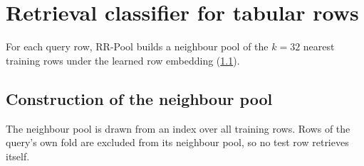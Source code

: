 \section{Retrieval classifier for tabular rows}\label{sec:method}
For each query row, RR-Pool builds a neighbour pool of the $k = 32$ nearest training rows under the learned row embedding (\cref{sec:neighbour-pool}).

\subsection{Construction of the neighbour pool}\label{sec:neighbour-pool}
The neighbour pool is drawn from an index over all training rows. Rows of the query's own fold are excluded from its neighbour pool, so no test row retrieves itself.
